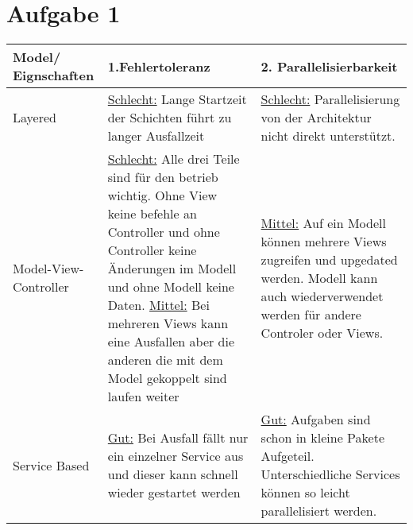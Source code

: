 \chapter*{Aufgabe 1}
\begin{center}
	\begin{tabular}	{|m{4cm}|m{6cm}|m{6cm}|}
		\hline
		Model/ Eignschaften & 1.Fehlertoleranz & 2. Parallelisierbarkeit  \\
		\hline 
		Layered & \underline{Schlecht:} Lange Startzeit der Schichten führt zu langer Ausfallzeit &  \underline{Schlecht:} Parallelisierung von der Architektur nicht direkt unterstützt. \\
		\hline 
		Model-View-Controller& \underline{Schlecht:}
		Alle drei Teile sind für den betrieb wichtig. Ohne View keine befehle an Controller und ohne Controller keine Änderungen im Modell und ohne Modell keine Daten.
		\underline{Mittel:} Bei mehreren Views kann eine Ausfallen aber die anderen die mit dem Model gekoppelt sind laufen weiter
		
				 & \underline{Mittel:} Auf ein Modell können mehrere Views zugreifen und upgedated werden. Modell kann auch wiederverwendet werden für andere Controler oder Views.\\
		\hline 
		Service Based& 
		\underline{Gut:} Bei Ausfall fällt nur ein einzelner Service aus und dieser kann schnell wieder gestartet werden & \underline{Gut:} Aufgaben sind schon in kleine Pakete Aufgeteil. Unterschiedliche Services können so leicht parallelisiert werden. \\
		\hline 
	\end{tabular}
\end{center}
